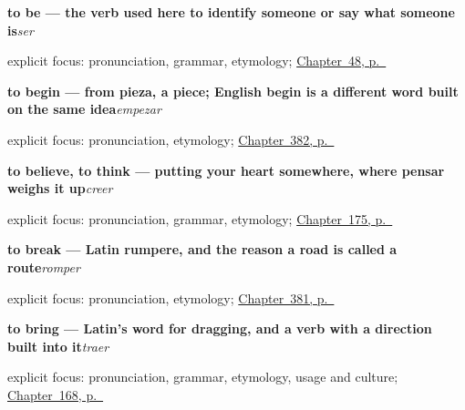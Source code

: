 \noindent\begin{minipage}[t]{\linewidth}
\raggedright
\textbf{to be — the verb used here to identify someone or say what someone is}\enspace\emph{ser}\par
\footnotesize explicit focus: pronunciation, grammar, etymology; \hyperref[ch:ser-y-estar]{Chapter~48, p.~\pageref*{ch:ser-y-estar}}
\end{minipage}\par\smallskip

\noindent\begin{minipage}[t]{\linewidth}
\raggedright
\textbf{to begin — from pieza, a piece; English begin is a different word built on the same idea}\enspace\emph{empezar}\par
\footnotesize explicit focus: pronunciation, etymology; \hyperref[ch:acabar-y-empezar]{Chapter~382, p.~\pageref*{ch:acabar-y-empezar}}
\end{minipage}\par\smallskip

\noindent\begin{minipage}[t]{\linewidth}
\raggedright
\textbf{to believe, to think — putting your heart somewhere, where pensar weighs it up}\enspace\emph{creer}\par
\footnotesize explicit focus: pronunciation, grammar, etymology; \hyperref[ch:spanish-giving-reasons]{Chapter~175, p.~\pageref*{ch:spanish-giving-reasons}}
\end{minipage}\par\smallskip

\noindent\begin{minipage}[t]{\linewidth}
\raggedright
\textbf{to break — Latin rumpere, and the reason a road is called a route}\enspace\emph{romper}\par
\footnotesize explicit focus: pronunciation, etymology; \hyperref[ch:lavar-y-romper]{Chapter~381, p.~\pageref*{ch:lavar-y-romper}}
\end{minipage}\par\smallskip

\noindent\begin{minipage}[t]{\linewidth}
\raggedright
\textbf{to bring — Latin's word for dragging, and a verb with a direction built into it}\enspace\emph{traer}\par
\footnotesize explicit focus: pronunciation, grammar, etymology, usage and culture; \hyperref[ch:spanish-traer]{Chapter~168, p.~\pageref*{ch:spanish-traer}}
\end{minipage}\par\smallskip

